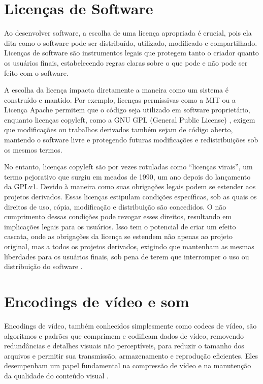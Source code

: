 \documentclass[12pt, %
openright, 
oneside, %
a4paper,    %
brazil]{facom-ufu-abntex2}
\begin{document}
\section{Licenças de Software}

Ao desenvolver software, a escolha de uma licença apropriada é crucial, pois
ela dita como o software pode ser distribuído, utilizado, modificado e
compartilhado. Licenças de software são instrumentos legais que protegem tanto
o criador quanto os usuários finais, estabelecendo regras claras sobre o que
pode e não pode ser feito com o software.

A escolha da licença impacta diretamente a maneira como um sistema é construído
e mantido. Por exemplo, licenças permissivas como a MIT
\cite{OpenSourceInitiative} ou a Licença Apache \cite{ApacheLicense2004}
permitem que o código seja utilizado em software proprietário, enquanto
licenças copyleft, como a GNU GPL (General Public License) \cite{gnu_gpl},
exigem que modificações ou trabalhos derivados também sejam de código aberto,
mantendo o software livre e protegendo futuras modificações e redistribuições
sob os mesmos termos.

No entanto, licenças copyleft são por vezes rotuladas como ``licenças virais'',
um termo pejorativo que surgiu em meados de 1990, um ano depois do lançamento
da GPLv1. Devido à maneira como suas obrigações legais podem se estender aos
projetos derivados. Essas licenças estipulam condições específicas, sob as
quais os direitos de uso, cópia, modificação e distribuição são concedidos. O
não cumprimento dessas condições pode revogar esses direitos, resultando em
implicações legais para os usuários. Isso tem o potencial de criar um efeito
cascata, onde as obrigações da licença se estendem não apenas ao projeto
original, mas a todos os projetos derivados, exigindo que mantenham as mesmas
liberdades para os usuários finais, sob pena de terem que interromper o uso ou
distribuição do software \cite{Golden2005}.

\section{Encodings de vídeo e som}

Encodings de vídeo, também conhecidos simplesmente como codecs de vídeo, são
algoritmos e padrões que comprimem e codificam dados de vídeo, removendo
redundâncias e detalhes visuais não perceptíveis, para reduzir o tamanho dos
arquivos e permitir sua transmissão, armazenamento e reprodução eficientes.
Eles desempenham um papel fundamental na compressão de vídeo e na manutenção da
qualidade do conteúdo visual \cite{CodecMerriamWebster2019}.
\end{document}
